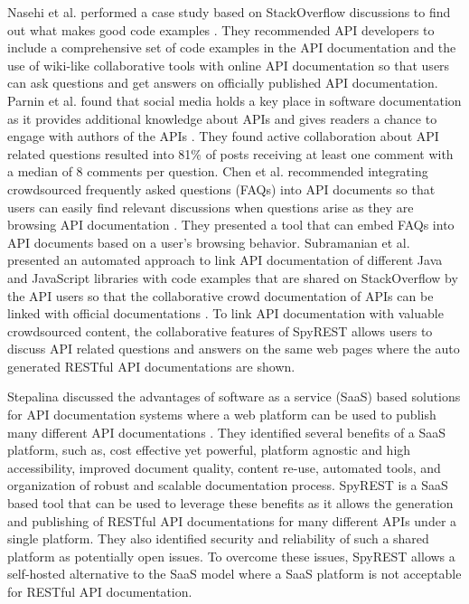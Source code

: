 \documentclass[conference]{IEEEtran}
\begin{document}
Nasehi et al. performed a case study based on StackOverflow discussions to find out what makes good code examples \cite{Nasehi_what_makes}. They recommended API developers to include a comprehensive set of code examples in the API documentation and the use of wiki-like collaborative tools with online API documentation so that users can ask questions and get answers on officially published API documentation. Parnin et al. found that social media holds a key place in software documentation as  it provides additional knowledge about APIs and gives readers a chance to engage with authors of the APIs \cite{Parnin_measuring}. They found active collaboration about API related questions resulted into 81\% of posts receiving at least one comment with a median of 8 comments per question. Chen et al. recommended integrating crowdsourced frequently asked questions (FAQs) into API documents so that users can easily find relevant discussions when questions arise as they are browsing API documentation \cite{Chen_who_asked}. They presented a tool that can embed FAQs into API documents based on a user's browsing behavior. Subramanian et al. presented an automated approach to link API documentation of different Java and JavaScript libraries with code examples that are shared on StackOverflow by the API users so that the collaborative crowd documentation of APIs can be linked with official documentations \cite{Subramanian_live}. To link API documentation with valuable crowdsourced content, the collaborative features of SpyREST allows users to discuss API related questions and answers on the same web pages where the auto generated RESTful API documentations are shown.

Stepalina discussed the advantages of software as a service (SaaS) based solutions for API documentation systems where a web platform can be used to publish many different API documentations \cite{Stepalina_saas}. They identified several benefits of a SaaS platform, such as, cost effective yet powerful, platform agnostic and high accessibility, improved document quality, content re-use, automated tools, and organization of robust and scalable documentation process. SpyREST is a SaaS based tool that can be used to leverage these benefits as it allows the generation and publishing of RESTful API documentations for many different APIs under a single platform. They also identified security and reliability of such a shared platform as potentially open issues. To overcome these issues, SpyREST allows a self-hosted alternative to the SaaS model where a SaaS platform is not acceptable for RESTful API documentation.
\end{document}
